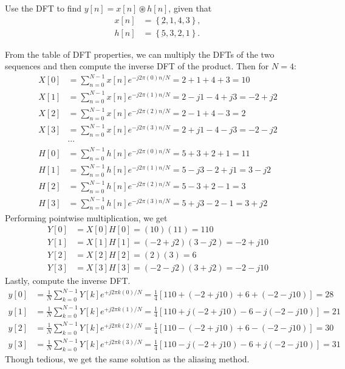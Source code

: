 \documentclass{report}
\begin{document}
\begin{example}
    Use the DFT to find $y[n]=x[n]\circledast h[n]$, given that 
    \begin{align*}
        x[n] &= \left\{\underbar{2},1,4,3\right\}, \\
        h[n] &= \left\{\underbar{5},3,2,1\right\}.
    \end{align*}
\end{example}
\begin{solution}
    From the table of DFT properties, we can multiply the DFTs of the two sequences and then compute the inverse DFT of the product. Then for $N=4$:
    \begin{align*}
        X[0] &= \sum_{n=0}^{N-1} x[n] e^{-j2\pi (0)n/N} = 2 + 1 + 4 + 3 = 10 \\
        X[1] &= \sum_{n=0}^{N-1} x[n] e^{-j2\pi (1)n/N} = 2 - j1 - 4 + j3 = -2+j2 \\
        X[2] &= \sum_{n=0}^{N-1} x[n] e^{-j2\pi (2)n/N} = 2 - 1 + 4 - 3 = 2 \\
        X[3] &= \sum_{n=0}^{N-1} x[n] e^{-j2\pi (3)n/N} = 2 + j1 - 4 - j3 = -2-j2 \\
        & \cdots \\
        H[0] &= \sum_{n=0}^{N-1} h[n] e^{-j2\pi (0)n/N} = 5 + 3 + 2 + 1 = 11 \\
        H[1] &= \sum_{n=0}^{N-1} h[n] e^{-j2\pi (1)n/N} = 5 - j3 - 2 + j1 = 3-j2 \\
        H[2] &= \sum_{n=0}^{N-1} h[n] e^{-j2\pi (2)n/N} = 5 - 3 + 2 - 1 = 3 \\
        H[3] &= \sum_{n=0}^{N-1} h[n] e^{-j2\pi (3)n/N} = 5 + j3 - 2 - 1 = 3+j2
    \end{align*}
    Performing pointwise multiplication, we get 
    \begin{align*}
        Y[0] &= X[0]H[0] = (10)(11) = 110 \\
        Y[1] &= X[1]H[1] = (-2+j2)(3-j2) = -2+j10 \\
        Y[2] &= X[2]H[2] = (2)(3) = 6 \\
        Y[3] &= X[3]H[3] = (-2-j2)(3+j2) = -2-j10
    \end{align*}
    Lastly, compute the inverse DFT.
    \begin{align*}
        y[0] &= \frac{1}{N}\sum_{k=0}^{N-1} Y[k] e^{+j2\pi k(0)/N} = \frac{1}{4}[110 + (-2+j10) + 6 + (-2-j10)] = 28 \\
        y[1] &= \frac{1}{N}\sum_{k=0}^{N-1} Y[k] e^{+j2\pi k(1)/N} = \frac{1}{4}[110 + j(-2+j10) - 6 - j(-2-j10)] = 21 \\
        y[2] &= \frac{1}{N}\sum_{k=0}^{N-1} Y[k] e^{+j2\pi k(2)/N} = \frac{1}{4}[110 - (-2+j10) + 6 - (-2-j10)] = 30 \\
        y[3] &= \frac{1}{N}\sum_{k=0}^{N-1} Y[k] e^{+j2\pi k(3)/N} = \frac{1}{4}[110 - j(-2+j10) - 6 + j(-2-j10)] = 31
    \end{align*}
    Though tedious, we get the same solution as the aliasing method.
\end{solution}
\end{document}
